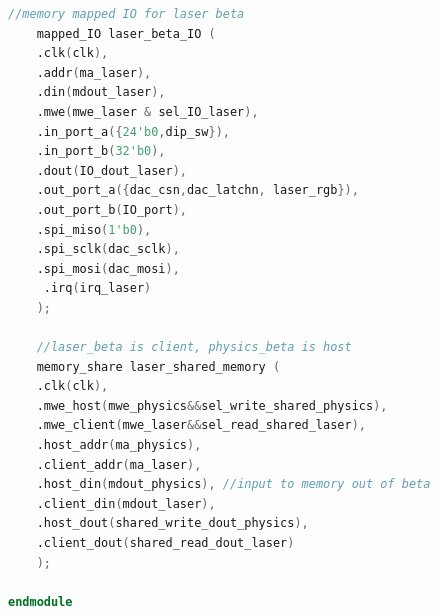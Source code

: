 \documentclass{article}
\begin{document}
\begin{lstlisting}[language=Verilog]
	//memory mapped IO for laser beta
	mapped_IO laser_beta_IO (
    .clk(clk), 
    .addr(ma_laser), 
    .din(mdout_laser), 
    .mwe(mwe_laser & sel_IO_laser), 
    .in_port_a({24'b0,dip_sw}), 
    .in_port_b(32'b0), 
    .dout(IO_dout_laser), 
    .out_port_a({dac_csn,dac_latchn, laser_rgb}), 
    .out_port_b(IO_port), 
    .spi_miso(1'b0),  
    .spi_sclk(dac_sclk), 
    .spi_mosi(dac_mosi),
	 .irq(irq_laser)
    );

	//laser_beta is client, physics_beta is host
	memory_share laser_shared_memory (
    .clk(clk), 
    .mwe_host(mwe_physics&&sel_write_shared_physics), 
    .mwe_client(mwe_laser&&sel_read_shared_laser), 
    .host_addr(ma_physics), 
    .client_addr(ma_laser), 
    .host_din(mdout_physics), //input to memory out of beta
    .client_din(mdout_laser), 
    .host_dout(shared_write_dout_physics), 
    .client_dout(shared_read_dout_laser)
    );
	 
endmodule
\end{lstlisting}

\printglossary
\end{document}
